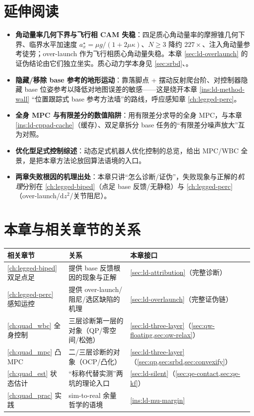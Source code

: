 \section*{延伸阅读}
\begin{itemize}
  \item \textbf{角动量率几何下界与飞行相 CAM 失稳}：四足质心角动量率的摩擦锥几何下界、临界水平加速度 $a_x^\star=\mu g/(1+2\mu\kappa)$、$N\ge 3$ 降约 $227\times$、注入角动量参考徒劳\cite{quad2025angmombound}；over-launch 作为飞行相质心角动量失稳\cite{cam2025flight}。本章 \cref{sec:ld-overlaunch} 的证伪结论由它们独立坐实。质心动力学本身见 \cref{sec:srbd}、\cite{orin2013centroidal}。
  \item \textbf{隐藏/移除 base 参考的地形运动}：靠落脚点 + 摆动反射爬台阶、对控制器隐藏 base 位姿参考以降低对地图误差的敏感\cite{corberes2023stairs,jenelten2023dtc}——这是绕开本章 \cref{ins:ld-method-wall} “位置跟踪式 base 参考方法墙”的路线，呼应感知章 \cref{ch:legged-perc}。
  \item \textbf{全身 MPC 与有限差分的数值陷阱}：用有限差分求导的全身 MPC\cite{howell2023wholebodympc}，与本章 \cref{ins:ld-cppad-cache}（缓存）、双足章拆分 base 任务的“有限差分噪声放大”互为对照。
  \item \textbf{优化型足式控制综述}：动态足式机器人优化控制的总览\cite{wensing2024legged}，给出 MPC/WBC 全景，是把本章方法论放回算法语境的入口。
  \item \textbf{两章失败根因的机理出处}：本章只讲“怎么诊断/证伪”，失败现象与正解的\emph{机理}分别在 \cref{ch:legged-biped}（点足 base 反馈/无静稳）与 \cref{ch:legged-perc}（over-launch/$\mathrm{d}z^2$/关节阻尼）。
\end{itemize}

\section*{本章与相关章节的关系}
\begin{table}[H]\centering\small
\begin{tabular}{lll}
\toprule
相关章节 & 关系 & 本章接口 \\
\midrule
\cref{ch:legged-biped} 双足点足 & 提供 base 反馈根因的现象与正解 & \cref{sec:ld-attribution}（完整诊断）\\
\cref{ch:legged-perc} 感知运控 & 提供 over-launch/阻尼/选区缺陷的机理 & \cref{sec:ld-overlaunch}（完整证伪链）\\
\cref{ch:quad_wbc} 全身控制 & 三层诊断第一层的对象（QP/零空间/松弛）& \cref{sec:ld-three-layer}（\cref{sec:qw-floating,sec:qw-relax}）\\
\cref{ch:quad_mpc} 凸 MPC & 二/三层诊断的对象（OCP/凸化）& \cref{sec:ld-three-layer}（\cref{sec:qp,sec:srbd,sec:convexify}）\\
\cref{ch:quad_est} 状态估计 & “标称代替实测”两坑的理论入口 & \cref{sec:ld-silent}（\cref{sec:qe-contact,sec:qe-kf}）\\
\cref{ch:quad_prac} 实践 & sim-to-real 余量哲学的语境 & \cref{ins:ld-mu-margin}\\
\bottomrule
\end{tabular}
\end{table}

